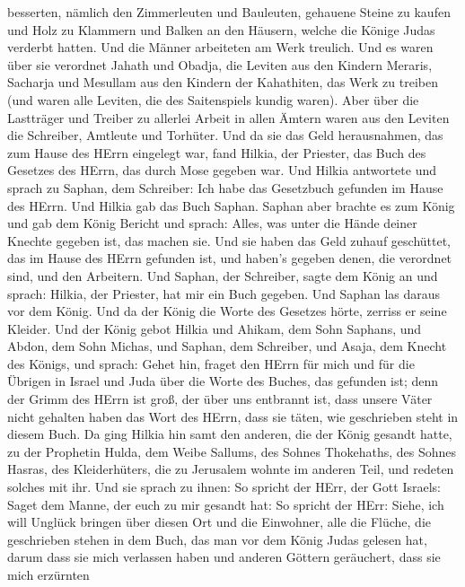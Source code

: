 besserten,  nämlich den Zimmerleuten und Bauleuten,
gehauene Steine zu kaufen und Holz zu Klammern und Balken an den
Häusern, welche die Könige Judas verderbt hatten.  Und die
Männer arbeiteten am Werk treulich. Und es waren über sie verordnet
Jahath und Obadja, die Leviten aus den Kindern Meraris, Sacharja und
Mesullam aus den Kindern der Kahathiten, das Werk zu treiben (und waren
alle Leviten, die des Saitenspiels kundig waren).  Aber
über die Lastträger und Treiber zu allerlei Arbeit in allen Ämtern waren
aus den Leviten die Schreiber, Amtleute und Torhüter.  Und
da sie das Geld herausnahmen, das zum Hause des HErrn eingelegt war,
fand Hilkia, der Priester, das Buch des Gesetzes des HErrn, das durch
Mose gegeben war.  Und Hilkia antwortete und sprach zu
Saphan, dem Schreiber: Ich habe das Gesetzbuch gefunden im Hause des
HErrn. Und Hilkia gab das Buch Saphan.  Saphan aber brachte
es zum König und gab dem König Bericht und sprach: Alles, was unter die
Hände deiner Knechte gegeben ist, das machen sie.  Und sie
haben das Geld zuhauf geschüttet, das im Hause des HErrn gefunden ist,
und haben's gegeben denen, die verordnet sind, und den Arbeitern.
 Und Saphan, der Schreiber, sagte dem König an und sprach:
Hilkia, der Priester, hat mir ein Buch gegeben. Und Saphan las daraus
vor dem König.  Und da der König die Worte des Gesetzes
hörte, zerriss er seine Kleider.  Und der König gebot
Hilkia und Ahikam, dem Sohn Saphans, und Abdon, dem Sohn Michas, und
Saphan, dem Schreiber, und Asaja, dem Knecht des Königs, und sprach:
 Gehet hin, fraget den HErrn für mich und für die Übrigen
in Israel und Juda über die Worte des Buches, das gefunden ist; denn der
Grimm des HErrn ist groß, der über uns entbrannt ist, dass unsere Väter
nicht gehalten haben das Wort des HErrn, dass sie täten, wie geschrieben
steht in diesem Buch.  Da ging Hilkia hin samt den anderen,
die der König gesandt hatte, zu der Prophetin Hulda, dem Weibe Sallums,
des Sohnes Thokehaths, des Sohnes Hasras, des Kleiderhüters, die zu
Jerusalem wohnte im anderen Teil, und redeten solches mit ihr.
 Und sie sprach zu ihnen: So spricht der HErr, der Gott
Israels: Saget dem Manne, der euch zu mir gesandt hat:  So
spricht der HErr: Siehe, ich will Unglück bringen über diesen Ort und
die Einwohner, alle die Flüche, die geschrieben stehen in dem Buch, das
man vor dem König Judas gelesen hat,  darum dass sie mich
verlassen haben und anderen Göttern geräuchert, dass sie mich erzürnten
